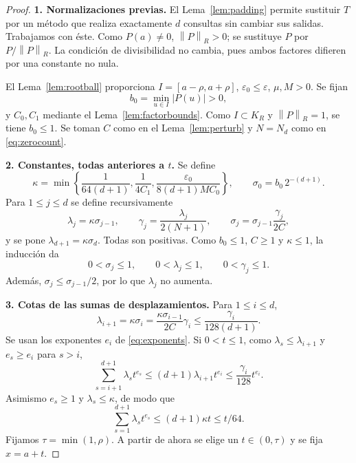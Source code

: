 \documentclass[11pt,a4paper]{article}
\numberwithin{equation}{section}
\theoremstyle{definition}
\theoremstyle{remark}
\newcommand{\norm}[1]{\left\lVert#1\right\rVert}
\newcommand{\paso}[1]{\par\smallskip\noindent\textbf{#1}\quad}
\begin{document}
\begin{proof}
\paso{1. Normalizaciones previas.}
El Lema~\ref{lem:padding} permite sustituir $T$ por un método que realiza exactamente $d$ consultas sin cambiar sus salidas. Trabajamos con éste. Como $P(a)\ne0$, $\norm P_R>0$; se sustituye $P$ por $P/\norm P_R$. La condición de divisibilidad no cambia, pues ambos factores difieren por una constante no nula.

El Lema~\ref{lem:rootball} proporciona $I=[a-\rho,a+\rho]$, $\varepsilon_0\le\varepsilon$, $\mu,M>0$. Se fijan
\[
b_0=\min_{u\in I}|P(u)|>0,
\]
y $C_0,C_1$ mediante el Lema~\ref{lem:factorbounds}. Como $I\subset K_R$ y $\norm P_R=1$, se tiene $b_0\le1$. Se toman $C$ como en el Lema~\ref{lem:perturb} y $N=N_d$ como en \eqref{eq:zerocount}.

\paso{2. Constantes, todas anteriores a $t$.}
Se define
\begin{equation}\label{eq:kappa}
\kappa=\min\left\{\frac1{64(d+1)},\frac1{4C_1},
\frac{\varepsilon_0}{8(d+1)MC_0}\right\},
\qquad \sigma_0=b_0\,2^{-(d+1)}.
\end{equation}
Para $1\le j\le d$ se define recursivamente
\begin{equation}\label{eq:constants}
\lambda_j=\kappa\sigma_{j-1},\qquad
\gamma_j=\frac{\lambda_j}{2(N+1)},\qquad
\sigma_j=\sigma_{j-1}\frac{\gamma_j}{2C},
\end{equation}
y se pone $\lambda_{d+1}=\kappa\sigma_d$. Todas son positivas. Como $b_0\le1$, $C\ge1$ y $\kappa\le1$, la inducción da
\[
0<\sigma_j\le1,\qquad0<\lambda_j\le1,\qquad0<\gamma_j\le1.
\]
Además, $\sigma_j\le\sigma_{j-1}/2$, por lo que $\lambda_j$ no aumenta.

\paso{3. Cotas de las sumas de desplazamientos.}
Para $1\le i\le d$,
\begin{equation}\label{eq:lambdagamma}
\lambda_{i+1}=\kappa\sigma_i
=\frac{\kappa\sigma_{i-1}}{2C}\gamma_i
\le\frac{\gamma_i}{128(d+1)}.
\end{equation}
Se usan los exponentes $e_i$ de \eqref{eq:exponents}. Si $0<t\le1$, como $\lambda_s\le\lambda_{i+1}$ y $e_s\ge e_i$ para $s>i$,
\begin{equation}\label{eq:tailstage}
\sum_{s=i+1}^{d+1}\lambda_st^{e_s}
\le(d+1)\lambda_{i+1}t^{e_i}
\le\frac{\gamma_i}{128}t^{e_i}.
\end{equation}
Asimismo $e_s\ge1$ y $\lambda_s\le\kappa$, de modo que
\begin{equation}\label{eq:totalstage}
\sum_{s=1}^{d+1}\lambda_st^{e_s}\le(d+1)\kappa t\le t/64.
\end{equation}
Fijamos $\tau=\min(1,\rho)$. A partir de ahora se elige un $t\in(0,\tau)$ y se fija $x=a+t$.


\end{proof}
\end{document}
